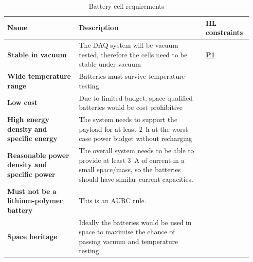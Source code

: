 \documentclass[]{report}
\newcommand{\hlreq}[1]{\hyperlink{req-#1}{\textbf{#1}}}
\begin{document}
\begin{table}[H]
  \centering
  \begin{tabular}{|L{0.2\textwidth}|L{0.495\textwidth}|L{0.2\textwidth}|}
    \hline
    \textbf{Name}                                        & \textbf{Description}                                                                                                                                               & \textbf{HL constraints} \\ \hline
    \textbf{Stable in vacuum}                            & The DAQ system will be vacuum tested, therefore the cells need to be stable under vacuum                                                                           & \hlreq{P1}              \\\hline
    \textbf{Wide temperature range}                      & Batteries must survive temperature testing                                                                                                                         &                         \\\hline
    \textbf{Low cost}                                    & Due to limited budget, space qualified batteries would be cost prohibitive                                                                                         &                         \\\hline
    \textbf{High energy density and specific energy}     & The system needs to support the payload for at least \SI{2}{\hour} at the worst-case power budget without recharging                                               &                         \\\hline
    \textbf{Reasonable power density and specific power} & The overall system needs to be able to provide at least \SI{3}{\ampere} of current in a small space/mass, so the batteries should have similar current capacities. &                         \\\hline
    \textbf{Must not be a lithium-polymer battery}       & This is an AURC rule.                                                                                                                                              &                         \\\hline
    \textbf{Space heritage}                              & Ideally the batteries would be used in space to maximise the chance of passing vacuum and temperature testing.                                                     &                         \\\hline
  \end{tabular}
  \caption{Battery cell requirements}
  \label{tabl:battery-requirements}
\end{table}
\end{document}
